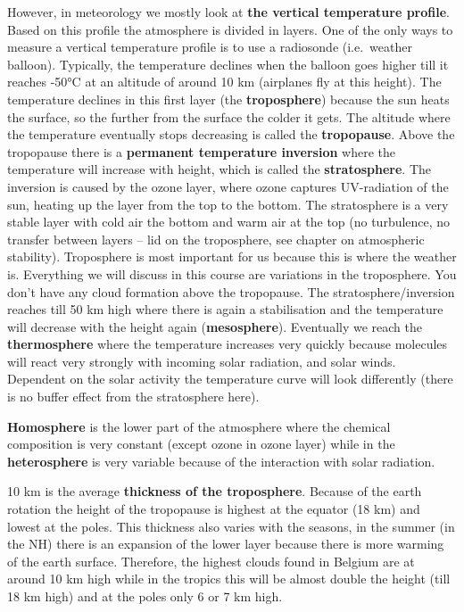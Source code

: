 \documentclass[oneside]{book}
\begin{document}
However, in meteorology we mostly look at \textbf{the vertical
temperature profile}. Based on this profile the atmosphere is divided in
layers. One of the only ways to measure a vertical temperature profile
is to use a radiosonde (i.e.~weather balloon). Typically, the
temperature declines when the balloon goes higher till it reaches -50°C
at an altitude of around 10 km (airplanes fly at this height). The
temperature declines in this first layer (the \textbf{troposphere})
because the sun heats the surface, so the further from the surface the
colder it gets. The altitude where the temperature eventually stops
decreasing is called the \textbf{tropopause}. Above the tropopause there
is a \textbf{permanent temperature inversion} where the temperature will
increase with height, which is called the \textbf{stratosphere}. The
inversion is caused by the ozone layer, where ozone captures
UV-radiation of the sun, heating up the layer from the top to the
bottom. The stratosphere is a very stable layer with cold air the bottom
and warm air at the top (no turbulence, no transfer between layers --
lid on the troposphere, see chapter on atmospheric stability).
Troposphere is most important for us because this is where the weather
is. Everything we will discuss in this course are variations in the
troposphere. You don't have any cloud formation above the tropopause.
The stratosphere/inversion reaches till 50 km high where there is again
a stabilisation and the temperature will decrease with the height again
(\textbf{mesosphere}). Eventually we reach the \textbf{thermosphere}
where the temperature increases very quickly because molecules will
react very strongly with incoming solar radiation, and solar winds.
Dependent on the solar activity the temperature curve will look
differently (there is no buffer effect from the stratosphere here).

\textbf{Homosphere} is the lower part of the atmosphere where the
chemical composition is very constant (except ozone in ozone layer)
while in the \textbf{heterosphere} is very variable because of the
interaction with solar radiation.

10 km is the average \textbf{thickness of the troposphere}. Because of
the earth rotation the height of the tropopause is highest at the
equator (18 km) and lowest at the poles. This thickness also varies with
the seasons, in the summer (in the NH) there is an expansion of the
lower layer because there is more warming of the earth surface.
Therefore, the highest clouds found in Belgium are at around 10 km high
while in the tropics this will be almost double the height (till 18 km
high) and at the poles only 6 or 7 km high.
\end{document}

